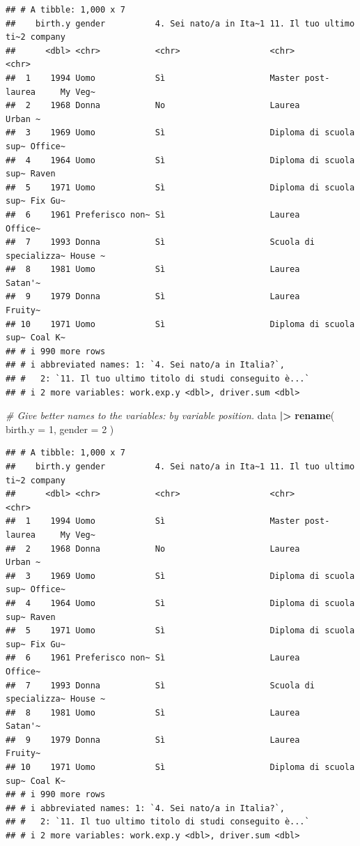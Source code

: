 \documentclass[
]{book}
\newenvironment{Shaded}{\begin{snugshade}}{\end{snugshade}}
\newcommand{\AttributeTok}[1]{\textcolor[rgb]{0.13,0.29,0.53}{#1}}
\newcommand{\CommentTok}[1]{\textcolor[rgb]{0.56,0.35,0.01}{\textit{#1}}}
\newcommand{\DecValTok}[1]{\textcolor[rgb]{0.00,0.00,0.81}{#1}}
\newcommand{\FunctionTok}[1]{\textcolor[rgb]{0.13,0.29,0.53}{\textbf{#1}}}
\newcommand{\NormalTok}[1]{#1}
\newcommand{\SpecialCharTok}[1]{\textcolor[rgb]{0.81,0.36,0.00}{\textbf{#1}}}
\begin{document}
\begin{verbatim}
## # A tibble: 1,000 x 7
##    birth.y gender          4. Sei nato/a in Ita~1 11. Il tuo ultimo ti~2 company
##      <dbl> <chr>           <chr>                  <chr>                  <chr>  
##  1    1994 Uomo            Sì                     Master post-laurea     My Veg~
##  2    1968 Donna           No                     Laurea                 Urban ~
##  3    1969 Uomo            Sì                     Diploma di scuola sup~ Office~
##  4    1964 Uomo            Sì                     Diploma di scuola sup~ Raven  
##  5    1971 Uomo            Sì                     Diploma di scuola sup~ Fix Gu~
##  6    1961 Preferisco non~ Sì                     Laurea                 Office~
##  7    1993 Donna           Sì                     Scuola di specializza~ House ~
##  8    1981 Uomo            Sì                     Laurea                 Satan'~
##  9    1979 Donna           Sì                     Laurea                 Fruity~
## 10    1971 Uomo            Sì                     Diploma di scuola sup~ Coal K~
## # i 990 more rows
## # i abbreviated names: 1: `4. Sei nato/a in Italia?`,
## #   2: `11. Il tuo ultimo titolo di studi conseguito è...`
## # i 2 more variables: work.exp.y <dbl>, driver.sum <dbl>
\end{verbatim}

\begin{Shaded}
\begin{Highlighting}[]
\CommentTok{\# Give better names to the variables: by variable position.}
\NormalTok{data }\SpecialCharTok{|\textgreater{}} 
  \FunctionTok{rename}\NormalTok{(}
    \AttributeTok{birth.y =} \DecValTok{1}\NormalTok{,}
    \AttributeTok{gender =} \DecValTok{2}
\NormalTok{  )}
\end{Highlighting}
\end{Shaded}

\begin{verbatim}
## # A tibble: 1,000 x 7
##    birth.y gender          4. Sei nato/a in Ita~1 11. Il tuo ultimo ti~2 company
##      <dbl> <chr>           <chr>                  <chr>                  <chr>  
##  1    1994 Uomo            Sì                     Master post-laurea     My Veg~
##  2    1968 Donna           No                     Laurea                 Urban ~
##  3    1969 Uomo            Sì                     Diploma di scuola sup~ Office~
##  4    1964 Uomo            Sì                     Diploma di scuola sup~ Raven  
##  5    1971 Uomo            Sì                     Diploma di scuola sup~ Fix Gu~
##  6    1961 Preferisco non~ Sì                     Laurea                 Office~
##  7    1993 Donna           Sì                     Scuola di specializza~ House ~
##  8    1981 Uomo            Sì                     Laurea                 Satan'~
##  9    1979 Donna           Sì                     Laurea                 Fruity~
## 10    1971 Uomo            Sì                     Diploma di scuola sup~ Coal K~
## # i 990 more rows
## # i abbreviated names: 1: `4. Sei nato/a in Italia?`,
## #   2: `11. Il tuo ultimo titolo di studi conseguito è...`
## # i 2 more variables: work.exp.y <dbl>, driver.sum <dbl>
\end{verbatim}
\end{document}
